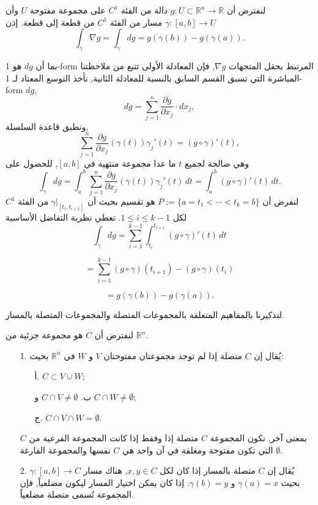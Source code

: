 \begin{theoreme}[2.5.1]
لنفترض أن \( g : U \subset \mathbb{R}^n \to \mathbb{R} \) دالة من الفئة \( C^1 \) على مجموعة مفتوحة \( U \) وأن \( \gamma : [a, b] \to U \) مسار من الفئة \( C^1 \) من قطعة إلى قطعة. إذن
\[ \int_\gamma \nabla g = \int_\gamma dg = g(\gamma(b)) - g(\gamma(a)). \]
\end{theoreme}

\begin{demonstration}

بما أن \( dg \) هو 1-form المرتبط بحقل المتجهات \( \nabla g \), فإن المعادلة الأولى تتبع من ملاحظتنا المباشرة التي تسبق القسم السابق بالنسبة للمعادلة الثانية, نأخذ التوسع المعتاد لـ 1-form \( dg \),
\[ dg = \sum_{j=1}^n \frac{\partial g}{\partial x_j} \cdot dx_j, \]
ونطبق قاعدة السلسلة,
\[ \sum_{j=1}^n \frac{\partial g}{\partial x_j} (\gamma(t)) \gamma_j'(t) = (g \circ \gamma)'(t), \]
وهي صالحة لجميع \( t \) ما عدا مجموعة منتهية في $[a, b]$, للحصول على
\[
\int_\gamma dg = \int_a^b \sum_{j=1}^n \frac{\partial g}{\partial x_j} (\gamma(t)) \gamma_j'(t) \, dt = \int_a^b (g \circ \gamma)'(t) \, dt. 
\]
لنفرض أن \( P := \{a = t_1 < \cdots < t_k = b\} \) هو تقسيم بحيث أن \( \gamma|_{[t_i, t_{i+1}]} \) من الفئة \( C^1 \) لكل \( 1 \leq i \leq k - 1 \). تعطي نظرية التفاضل الأساسية
\[ \int_\gamma dg = \sum_{i=1}^{k-1} \int_{t_i}^{t_{i+1}} (g \circ \gamma)'(t) \, dt \]

\[ = \sum_{i=1}^{k-1} (g \circ \gamma)(t_{i+1}) - (g \circ \gamma)(t_i) \]

\[ = g(\gamma(b)) - g(\gamma(a)). \]

\end{demonstration}

لتذكيرنا بالمفاهيم المتعلقة بالمجموعات المتصلة والمجموعات المتصلة بالمسار.

\begin{definition}
لنفترض أن \( C \) هو مجموعة جزئية من \( \mathbb{R}^n \).
\begin{enumerate}
    \item[1.]  يُقال إن \( C \) متصلة إذا لم توجد مجموعتان مفتوحتان \( V \) و \( W \) في \( \mathbb{R}^n \) بحيث:
\begin{itemize}
    \item [أ.] \( C \subset V \cup W \);
    \item [ ب.] \( C \cap V \neq \emptyset \) و \( C \cap W \neq \emptyset \);
    \item [ ج.] \( C \cap V \cap W = \emptyset \).
\end{itemize}   
   بمعنى آخر, تكون المجموعة \( C \) متصلة إذا وفقط إذا كانت المجموعة الفرعية من \( C \) التي تكون مفتوحة ومغلقة في آن واحد هي \( C \) نفسها والمجموعة الفارغة \( \emptyset \).
\item[2.]  يُقال إن \( C \) متصلة بالمسار إذا كان لكل \( x, y \in C \), هناك مسار \( \gamma : [a, b] \to C \) بحيث \( \gamma(a) = x \) و \( \gamma(b) = y \). إذا كان يمكن اختيار المسار ليكون مضلعياً, فإن المجموعة تُسمى متصلة مضلعياً.
\end{enumerate}
\end{definition}

